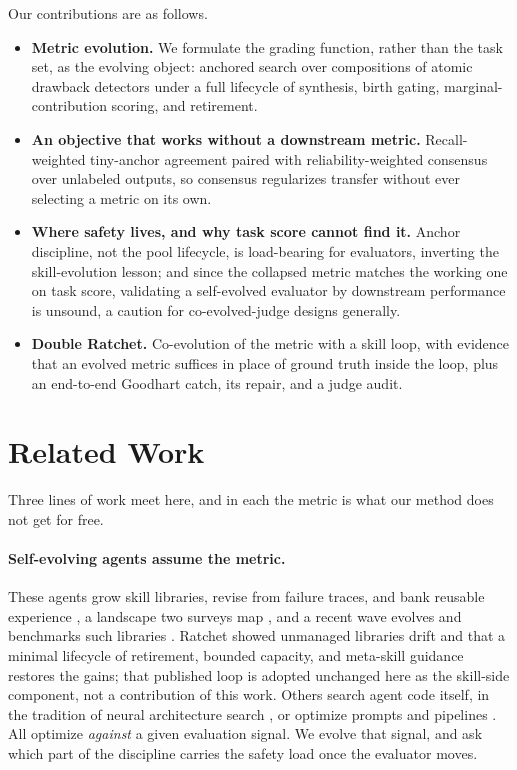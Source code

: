 \documentclass[letterpaper]{article} %
\begin{document}
Our contributions are as follows.
\begin{itemize}
\item \textbf{Metric evolution.} We formulate the grading function, rather than the task set, as the evolving object: anchored search over compositions of atomic drawback detectors under a full lifecycle of synthesis, birth gating, marginal-contribution scoring, and retirement.
\item \textbf{An objective that works without a downstream metric.} Recall-weighted tiny-anchor agreement paired with reliability-weighted consensus over unlabeled outputs, so consensus regularizes transfer without ever selecting a metric on its own.
\item \textbf{Where safety lives, and why task score cannot find it.} Anchor discipline, not the pool lifecycle, is load-bearing for evaluators, inverting the skill-evolution lesson; and since the collapsed metric matches the working one on task score, validating a self-evolved evaluator by downstream performance is unsound, a caution for co-evolved-judge designs generally.
\item \textbf{Double Ratchet.} Co-evolution of the metric with a skill loop, with evidence that an evolved metric suffices in place of ground truth inside the loop, plus an end-to-end Goodhart catch, its repair, and a judge audit.
\end{itemize}

\section{Related Work}

Three lines of work meet here, and in each the metric is what our method does not get for free.

\paragraph{Self-evolving agents assume the metric.}
These agents grow skill libraries, revise from failure traces, and bank reusable experience \citep{wang2023voyager,shinn2023reflexion,madaan2023selfrefine,zhao2024expel,chen2024automanual,wang2024awm,park2023generative}, a landscape two surveys map \citep{zhang2025surveyselfevolving,wang2024survey}, and a recent wave evolves and benchmarks such libraries \citep{wu2025evolver,yang2026autoskill,xia2026skillrl,alibaba2026trace2skill,zhang2026ecs,wang2026strategygenes,li2026skillsbench}. Ratchet \citep{zhang2026ratchet,zhang2026librarydrift} showed unmanaged libraries drift and that a minimal lifecycle of retirement, bounded capacity, and meta-skill guidance restores the gains; that published loop is adopted unchanged here as the skill-side component, not a contribution of this work. Others search agent code itself, in the tradition of neural architecture search \citep{hu2025automated,elsken2019nas}, or optimize prompts and pipelines \citep{khattab2024dspy,yang2023opro,yuksekgonul2024textgrad,fernando2024promptbreeder}. All optimize \emph{against} a given evaluation signal. We evolve that signal, and ask which part of the discipline carries the safety load once the evaluator moves.
\end{document}
